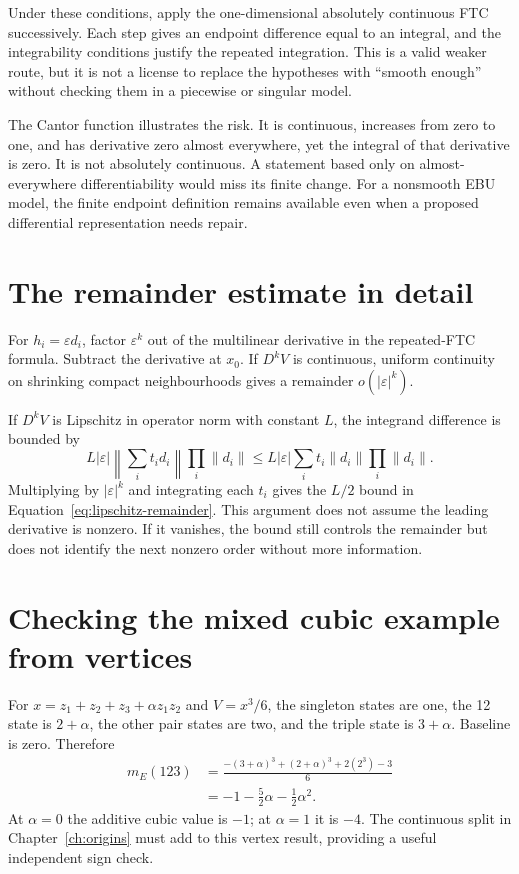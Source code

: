 Under these conditions, apply the one-dimensional absolutely continuous FTC successively. Each step gives an endpoint difference equal to an integral, and the integrability conditions justify the repeated integration. This is a valid weaker route, but it is not a license to replace the hypotheses with ``smooth enough'' without checking them in a piecewise or singular model.

The Cantor function illustrates the risk. It is continuous, increases from zero to one, and has derivative zero almost everywhere, yet the integral of that derivative is zero. It is not absolutely continuous. A statement based only on almost-everywhere differentiability would miss its finite change. For a nonsmooth EBU model, the finite endpoint definition remains available even when a proposed differential representation needs repair.

\section{The remainder estimate in detail}
For $h_i=\varepsilon d_i$, factor $\varepsilon^k$ out of the multilinear derivative in the repeated-FTC formula. Subtract the derivative at $x_0$. If $D^kV$ is continuous, uniform continuity on shrinking compact neighbourhoods gives a remainder $o(|\varepsilon|^k)$.

If $D^kV$ is Lipschitz in operator norm with constant $L$, the integrand difference is bounded by
\begin{equation}
 L|\varepsilon|\left\|\sum_i t_i d_i\right\|
 \prod_i\|d_i\|
 \leq L|\varepsilon|\sum_i t_i\|d_i\|\prod_i\|d_i\|.
\end{equation}
Multiplying by $|\varepsilon|^k$ and integrating each $t_i$ gives the $L/2$ bound in Equation~\ref{eq:lipschitz-remainder}. This argument does not assume the leading derivative is nonzero. If it vanishes, the bound still controls the remainder but does not identify the next nonzero order without more information.

\section{Checking the mixed cubic example from vertices}
For $x=z_1+z_2+z_3+\alpha z_1z_2$ and $V=x^3/6$, the singleton states are one, the 12 state is $2+\alpha$, the other pair states are two, and the triple state is $3+\alpha$. Baseline is zero. Therefore
\begin{align}
 m_E(123)
 &=\frac{-(3+\alpha)^3+(2+\alpha)^3+2(2^3)-3}{6}\nonumber\\
 &=-1-\frac52\alpha-\frac12\alpha^2.
\end{align}
At $\alpha=0$ the additive cubic value is $-1$; at $\alpha=1$ it is $-4$. The continuous split in Chapter~\ref{ch:origins} must add to this vertex result, providing a useful independent sign check.

